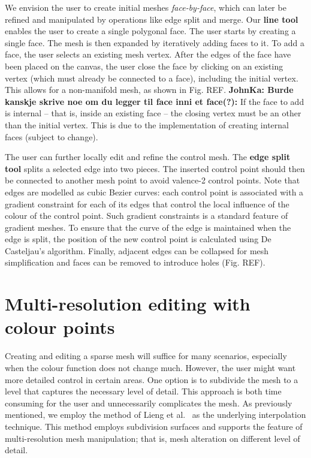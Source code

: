 \documentclass{egpubl}
\newcommand{\note}[3]{{\color{#2}\textbf{#1: #3}}}
\newcommand{\john}[1]{\note{JohnKa}{ForestGreen}{#1}}
\begin{document}
We envision the user to create initial meshes \textit{face-by-face}, which can later be refined and manipulated by operations like edge split and merge. Our \textbf{line tool} enables the user to create a single polygonal face. The user starts by creating a single face. The mesh is then expanded by iteratively adding faces to it. To add a face, the user selects an existing mesh vertex. After the edges of the face have been placed on the canvas, the user close the face by clicking on an existing vertex (which must already be connected to a face), including the initial vertex. This allows for a non-manifold mesh, as shown in Fig. REF. \john{Burde kanskje skrive noe om du legger til face inni et face(?):} If the face to add is internal -- that is, inside an existing face -- the closing vertex must be an other than the initial vertex. This is due to the implementation of creating internal faces (subject to change).

The user can further locally edit and refine the control mesh. The \textbf{edge split tool} splits a selected edge into two pieces. The inserted control point should then be connected to another mesh point to avoid valence-2 control points. Note that edges are modelled as cubic Bezier curves: each control point is associated with a gradient constraint for each of its edges that control the local influence of the colour of the control point. Such gradient constraints is a standard feature of gradient meshes. To ensure that the curve of the edge is maintained when the edge is split, the position of the new control point is calculated using De Casteljau's algorithm. Finally, adjacent edges can be collapsed for mesh simplification and faces can be removed to introduce holes (Fig. REF).

\section{Multi-resolution editing with colour points}
\label{sec:DP}

Creating and editing a sparse mesh will suffice for many scenarios, especially when the colour function does not change much. However, the user might want more detailed control in certain areas. One option is to subdivide the mesh to a level that captures the necessary level of detail. This approach is both time consuming for the user and unnecessarily complicates the mesh. As previously mentioned, we employ the method of Lieng et al.~\cite{Lieng:2016} as the underlying interpolation technique. This method employs subdivision surfaces and supports the feature of multi-resolution mesh manipulation; that is, mesh alteration on different level of detail. 
\end{document}
